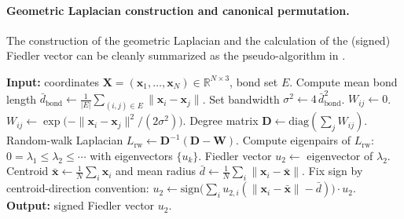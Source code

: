 \documentclass{article}
\theoremstyle{plain}
\theoremstyle{definition}
\theoremstyle{remark}
\newcommand{\1}{\mathbf{1}}
\newcommand{\W}{\mathbf{W}}
\newcommand{\D}{\mathbf{D}}
\begin{document}
\paragraph{Geometric Laplacian construction and canonical permutation.} The construction of the geometric Laplacian and the calculation of the (signed) Fiedler vector can be cleanly summarized as the pseudo-algorithm in .

\begin{algorithm}[ht]
\caption{Geometric Laplacian and signed Fiedler vector}
\label{alg:geom-lap-fiedler}
\begin{algorithmic}
\STATE \textbf{Input:} coordinates $\mathbf{X} = (\mathbf{x}_1,\dots,\mathbf{x}_N) \in \mathbb{R}^{N\times 3}$, bond set $E$.
\STATE Compute mean bond length $\bar d_{\text{bond}} \gets \frac{1}{|E|}\sum_{(i,j)\in E} \|\mathbf{x}_i-\mathbf{x}_j\|$.
\STATE Set bandwidth $\sigma^2 \gets 4\,\bar d_{\text{bond}}^2$.
      \STATE $W_{ij} \gets 0$.
    \ELSE
      \STATE $W_{ij} \gets \exp\big(-\|\mathbf{x}_i-\mathbf{x}_j\|^2/(2\sigma^2)\big)$.
    \ENDIF
  \ENDFOR
\ENDFOR
\STATE Degree matrix $\D \gets \mathrm{diag}(\sum_j W_{ij})$.
\STATE Random-walk Laplacian $L_{\mathrm{rw}} \gets \D^{-1}(\D-\W)$.
\STATE Compute eigenpairs of $L_{\mathrm{rw}}$: $0=\lambda_1\le \lambda_2\le \cdots$ with eigenvectors $\{u_k\}$.
\STATE Fiedler vector $u_2 \gets$ eigenvector of $\lambda_2$.
\STATE Centroid $\bar{\mathbf{x}} \gets \frac{1}{N}\sum_i \mathbf{x}_i$ and mean radius $\bar d \gets \frac{1}{N}\sum_i \|\mathbf{x}_i-\bar{\mathbf{x}}\|$.
\STATE Fix sign by centroid-direction convention:
\STATE \hspace{1em}$u_2 \gets \mathrm{sign}\big(\sum_i u_{2,i}(\|\mathbf{x}_i-\bar{\mathbf{x}}\| - \bar d)\big)\cdot u_2$.
\STATE \textbf{Output:} signed Fiedler vector $u_2$.
\end{algorithmic}
\end{algorithm}
\end{document}
